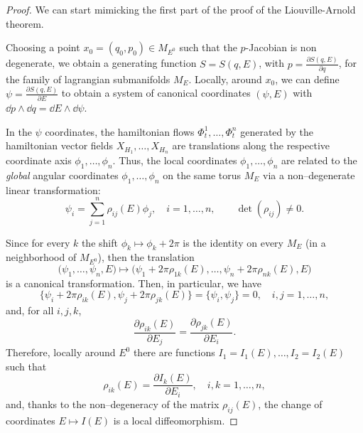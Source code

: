 \documentclass[english,fontsize=11pt,paper=b5]{scrbook}
\theoremstyle{definition}
\begin{document}
      \begin{proof}
        We can start mimicking the first part of the proof of the Liouville-Arnold theorem. %

        Choosing a point $x_0 = (q_0, p_0) \in M_{E^0}$ such that the $p$-Jacobian is non degenerate, we obtain a generating function $S=S(q,E)$, with $p = \frac{\partial S(q,E)}{\partial q}$, for the family of lagrangian submanifolds $M_E$.
        Locally, around $x_0$, we can define $\psi = \frac{\partial S(q,E)}{\partial E}$ to obtain a system of canonical coordinates $(\psi, E)$ with $\dd p\wedge\dd q = \dd E\wedge \dd \psi$.

        In the $\psi$ coordinates, the hamiltonian flows $\Phi_t^1, \ldots, \Phi_t^n$ generated by the hamiltonian vector fields $X_{H_1}, \ldots, X_{H_n}$ are translations along the respective coordinate axis $\phi_1, \ldots, \phi_n$.
        Thus, the local coordinates $\phi_1, \ldots, \phi_n$ are related to the \emph{global} angular coordinates $\phi_1, \ldots, \phi_n$ on the same torus $M_E$ via a non--degenerate linear transformation:
        \begin{equation}
          \psi_i = \sum_{j=1}^n \rho_{ij}(E)\phi_j, \quad i=1,\ldots,n, \qquad \det(\rho_{ij})\neq 0.
        \end{equation}

        Since for every $k$ the shift $\phi_k \mapsto \phi_k + 2\pi$ is the identity on every $M_E$ (in a neighborhood of $M_{E^0}$), then the translation
        \begin{equation}
          \big(\psi_1, \ldots, \psi_n, E\big) \mapsto \big(\psi_1 + 2\pi \rho_{1k}(E), \ldots, \psi_n + 2\pi \rho_{nk}(E), E\big)
        \end{equation}
        is a canonical transformation.
        Then, in particular, we have
        \begin{equation}
          \big\{
            \psi_i + 2\pi \rho_{ik}(E), \psi_j + 2\pi \rho_{jk}(E)
          \big\} = \big\{\psi_i, \psi_j\big\} = 0, \quad i,j = 1, \ldots, n,
        \end{equation}
        and, for all $i,j,k$,
        \begin{equation}
          \frac{\partial \rho_{ik}(E)}{\partial E_j}
          = \frac{\partial \rho_{jk}(E)}{\partial E_i}.
        \end{equation}
        Therefore, locally around $E^0$ there are functions $I_1 = I_1(E), \ldots, I_2 = I_2(E)$ such that
        \begin{equation}
          \rho_{ik}(E) = \frac{\partial I_k(E)}{\partial E_i}, \quad i,k=1,\ldots,n,
        \end{equation}
        and, thanks to the non--degeneracy of the matrix $\rho_{ij}(E)$, the change of coordinates $E \mapsto I(E)$ is a local diffeomorphism.


\end{proof}
\end{document}

